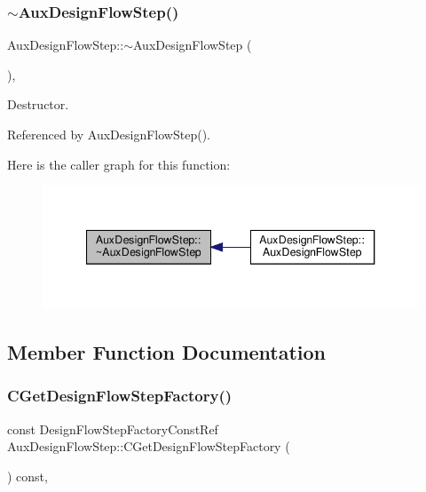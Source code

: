 \subsubsection{\texorpdfstring{$\sim$\+Aux\+Design\+Flow\+Step()}{~AuxDesignFlowStep()}}
{\footnotesize\ttfamily Aux\+Design\+Flow\+Step\+::$\sim$\+Aux\+Design\+Flow\+Step (\begin{DoxyParamCaption}{ }\end{DoxyParamCaption})\hspace{0.3cm}{\ttfamily [override]}, {\ttfamily [default]}}



Destructor. 



Referenced by Aux\+Design\+Flow\+Step().

Here is the caller graph for this function\+:
\nopagebreak
\begin{figure}[H]
\begin{center}
\leavevmode
\includegraphics[width=340pt]{db/df5/classAuxDesignFlowStep_aef7b02869e6c9c4dac631332ab0b8b92_icgraph}
\end{center}
\end{figure}


\subsection{Member Function Documentation}
\mbox{\label{classAuxDesignFlowStep_a062a1d93bb92d8df06c9cbf6340573ae}} 
\subsubsection{\texorpdfstring{C\+Get\+Design\+Flow\+Step\+Factory()}{CGetDesignFlowStepFactory()}}
{\footnotesize\ttfamily const Design\+Flow\+Step\+Factory\+Const\+Ref Aux\+Design\+Flow\+Step\+::\+C\+Get\+Design\+Flow\+Step\+Factory (\begin{DoxyParamCaption}{ }\end{DoxyParamCaption}) const\hspace{0.3cm}{\ttfamily [override]}, {\ttfamily [virtual]}}



